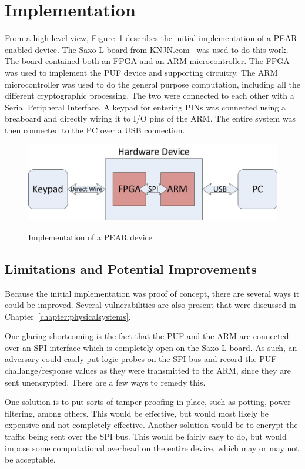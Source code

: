 \section{Implementation}
From a high level view, Figure~\ref{fig:peararchitecture} describes the initial implementation of a PEAR enabled device.
The Saxo-L board from KNJN.com~\cite{KNJN} was used to do this work. The board contained both an FPGA and an ARM
microcontroller. The FPGA was used to implement the PUF device and supporting circuitry. The ARM microcontroller
was used to do the general purpose computation, including all the different cryptographic processing. The two
were connected to each other with a Serial Peripheral Interface. A keypad for entering PINs was connected using a
breaboard and directly wiring it to I/O pins of the ARM. The entire system was then connected to the PC over
a USB connection.

\begin{figure}[!ht]
\includegraphics[width=500px]{images/pearimpl.jpg}
\label{fig:peararchitecture}
\caption{Implementation of a PEAR device}
\end{figure}
\FloatBarrier

\subsection{Limitations and Potential Improvements}
Because the initial implementation was proof of concept, there are several ways it could be improved. Several
vulnerabilities are also present that were discussed in Chapter~\ref{chapter:physicalsystems}.

One glaring shortcoming is the fact that the PUF and the ARM are connected over an SPI interface which is completely
open on the Saxo-L board. As such, an adversary could easily put logic probes on the SPI bus and record the PUF
challange/response values as they were transmitted to the ARM, since they are sent unencrypted. There are a few
ways to remedy this. 

One solution is to put sorts of tamper proofing in place, such as potting, power filtering, among others. 
This would be effective, but would most likely be expensive and not completely effective. Another solution would
be to encrypt the traffic being sent over the SPI bus. This would be fairly easy to do, but would impose some
computational overhead on the entire device, which may or may not be acceptable. 

